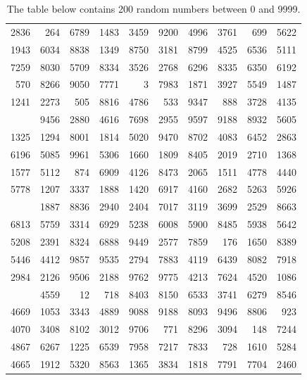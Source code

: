 \documentclass[
]{book}
\begin{document}
\begin{table}
\caption{\label{tab:A1}The table below contains 200 random numbers between 0 and 9999.}
\centering
\begin{tabular}[t]{rrrrrrrrrr}
\toprule
 &  &  &  &  &  &  &  &  & \\
\midrule
2836 & 264 & 6789 & 1483 & 3459 & 9200 & 4996 & 3761 & 699 & 5622\\
1943 & 6034 & 8838 & 1349 & 8750 & 3181 & 8799 & 4525 & 6536 & 5111\\
7259 & 8030 & 5709 & 8334 & 3526 & 2768 & 6296 & 8335 & 6350 & 6192\\
570 & 8266 & 9050 & 7771 & 3 & 7983 & 1871 & 3927 & 5549 & 1487\\
1241 & 2273 & 505 & 8816 & 4786 & 533 & 9347 & 888 & 3728 & 4135\\
\addlinespace
6688 & 9456 & 2880 & 4616 & 7698 & 2955 & 9597 & 9188 & 8932 & 5605\\
1325 & 1294 & 8001 & 1814 & 5020 & 9470 & 8702 & 4083 & 6452 & 2863\\
6196 & 5085 & 9961 & 5306 & 1660 & 1809 & 8405 & 2019 & 2710 & 1368\\
1577 & 5112 & 874 & 6909 & 4126 & 8473 & 2065 & 1511 & 4778 & 4440\\
5778 & 1207 & 3337 & 1888 & 1420 & 6917 & 4160 & 2682 & 5263 & 5926\\
\addlinespace
6635 & 1887 & 8836 & 2940 & 2404 & 7017 & 3119 & 3699 & 2529 & 8663\\
6813 & 5759 & 3314 & 6929 & 5238 & 6008 & 5900 & 8485 & 5938 & 5642\\
5208 & 2391 & 8324 & 6888 & 9449 & 2577 & 7859 & 176 & 1650 & 8389\\
5446 & 4412 & 9857 & 9535 & 2794 & 7883 & 4119 & 6439 & 8082 & 7918\\
2984 & 2126 & 9506 & 2188 & 9762 & 9775 & 4213 & 7624 & 4520 & 1086\\
\addlinespace
371 & 4559 & 12 & 718 & 8403 & 8150 & 6533 & 3741 & 6279 & 8546\\
4669 & 1053 & 3343 & 4889 & 9088 & 9188 & 8093 & 9496 & 8806 & 923\\
4070 & 3408 & 8102 & 3012 & 9706 & 771 & 8296 & 3094 & 148 & 7244\\
4867 & 6267 & 1225 & 6539 & 7958 & 7217 & 7833 & 728 & 1610 & 5284\\
4665 & 1912 & 5320 & 8563 & 1365 & 3834 & 1818 & 7791 & 7704 & 2460\\
\bottomrule
\end{tabular}
\end{table}
\end{document}
